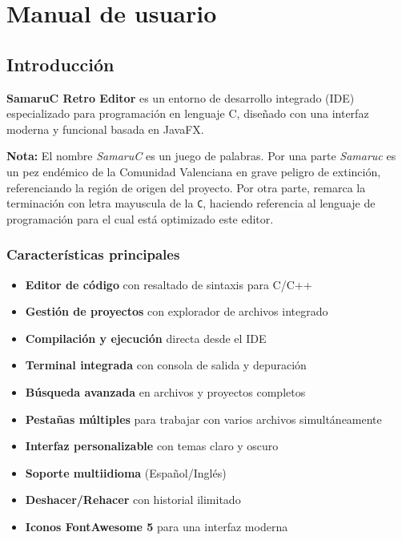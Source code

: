\documentclass[../../main.tex]{subfiles}
\begin{document}
\chapter{Manual de usuario}


\section{Introducción}
\textbf{SamaruC Retro Editor} es un entorno de desarrollo integrado (IDE) especializado para programación en lenguaje C, diseñado con una interfaz moderna y funcional basada en JavaFX.

\par{\textbf{Nota:} El nombre \textit{SamaruC} es un juego de palabras. Por una parte \textit{Samaruc} es un pez endémico de la Comunidad Valenciana en grave peligro de extinción, referenciando la región de origen del proyecto. Por otra parte, remarca la terminación con letra mayuscula de la \texttt{C}, haciendo referencia al lenguaje de programación para el cual está optimizado este editor.}

\subsection{Características principales}
\begin{itemize}
    \item \textbf{Editor de código} con resaltado de sintaxis para C/C++
    \item \textbf{Gestión de proyectos} con explorador de archivos integrado
    \item \textbf{Compilación y ejecución} directa desde el IDE
    \item \textbf{Terminal integrada} con consola de salida y depuración
    \item \textbf{Búsqueda avanzada} en archivos y proyectos completos
    \item \textbf{Pestañas múltiples} para trabajar con varios archivos simultáneamente
    \item \textbf{Interfaz personalizable} con temas claro y oscuro
    \item \textbf{Soporte multiidioma} (Español/Inglés)
    \item \textbf{Deshacer/Rehacer} con historial ilimitado
    \item \textbf{Iconos FontAwesome 5} para una interfaz moderna
\end{itemize}
\end{document}
